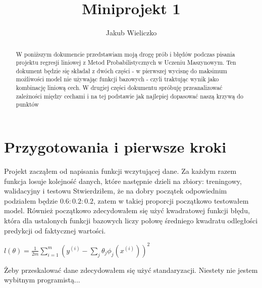 \documentclass[polish,12pt,a4paper]{extarticle}
\title{Miniprojekt 1}
\author{Jakub Wieliczko}
\begin{document}
\begin{abstract}
    W poniższym dokumencie przedstawiam moją drogę prób i błędów podczas pisania projektu regresji liniowej z Metod Probabilistycznych w Uczeniu Maszynowym. Ten dokument będzie się składał z dwóch części - w pierwszej wycisnę do maksimum możliwości model nie używając funkcji bazowych - czyli traktując wynik jako kombinację liniową cech. W drugiej części dokumentu spróbuję przeanalizować zależności między cechami i na tej podstawie jak najlepiej dopasować naszą krzywą do punktów
\end{abstract}

\section*{Przygotowania i pierwsze kroki}
Projekt zacząłem od napisania funkcji wczytującej dane. Za każdym razem funkcja losuje kolejność danych, które następnie dzieli na zbiory: treningowy, walidacyjny i testowu Stwierdziłem, że na dobry początek odpowiednim podziałem będzie $0.6 : 0.2 : 0.2$, zatem w takiej proporcji początkowo testowałem model. Również początkowo zdecydowałem się użyć kwadratowej funkcji błędu, która dla ustalonych funkcji bazowych liczy połowę średniego kwadratu odległości predykcji od faktycznej wartości.
\begin{center}
      $l(\theta) = \frac{1}{2m} \sum_{i=1}^m (y^{(i)} - \sum_{j}\theta_j \phi_j(x^{(i)}))^2$

\end{center}
Żeby przeskalować dane zdecydowałem się użyć standaryzacji. Niestety nie jestem wybitnym programistą...
\end{document}
